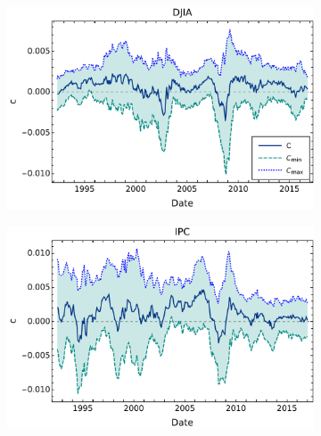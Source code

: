 \documentclass{elsarticle}
\begin{document}
\begin{figure}[h!tb]
        \centering
        \begin{subfigure}[b]{0.44\textwidth}
            \centering
            \includegraphics[width=\textwidth]{figures/SimmTReturns/Simetria_DJIA_CL005.pdf}
            \label{fig:SymmTReturns005DJIA}
        \end{subfigure}
        \quad
        \begin{subfigure}[b]{0.44\textwidth}
            \centering 
            \includegraphics[width=\textwidth]{figures/SimmTReturns/Simetria_IPC_CL005.pdf}
            \label{fig:SymmTReturns005IPC}
        \end{subfigure}
        \begin{subfigure}[b]{0.44\textwidth}
            \centering 

\end{subfigure}
\end{figure}
\end{document}
